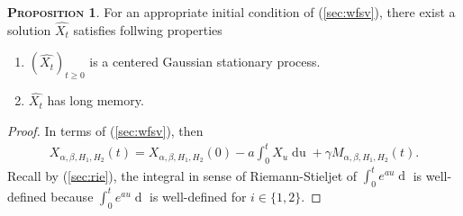 \documentclass[a4paper, twoside, 11pt]{article}
\theoremstyle{definition}
\newtheorem{proposition}[definition]{\scshape Proposition}
\begin{document}
\begin{proposition}
  For an appropriate initial condition of (\ref{sec:wfsv}), there exist a solution $\hat{X_t}$ satisfies follwing properties
\begin{enumerate}[topsep=0pt, itemsep=-1ex, partopsep=1ex, parsep=1ex, label=(\roman*)]
  \item $(\hat{X_t})_{t\ge 0}$ is a centered Gaussian stationary process.
  \item $\hat{X_t}$ has long memory.
  \end{enumerate}
\end{proposition}
\begin{proof}
  In terms of (\ref{sec:wfsv}), then
  \begin{eqnarray*}
	X_{\alpha,\beta,H_1,H_2}(t) = X_{\alpha,\beta,H_1,H_2}(0) - a\int_0^t X_u \mathop{du} + \gamma M_{\alpha,\beta,H_1,H_2}(t).
\end{eqnarray*}
Recall by (\ref{sec:rie}), the integral in sense of Riemann-Stieljet of $\int_0^t e^{au} \mathop{dM_{\alpha,\beta,H_1,H_2}}$ is well-defined because $\int_0^t e^{au} \mathop{dU_{H_i}}$ is well-defined for $i\in\{1,2\}$.


\end{proof}
\end{document}
